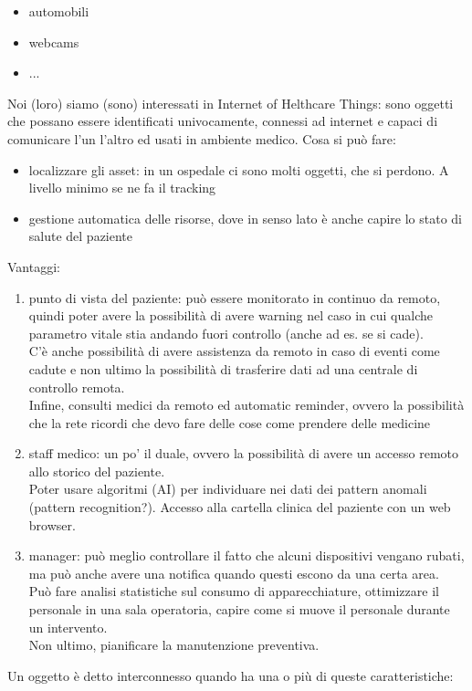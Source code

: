 \documentclass[oneside, 12pt]{extbook}
\begin{document}
\begin{itemize}
	\item automobili
	\item webcams
	\item ...
\end{itemize}
Noi (loro) siamo (sono) interessati in Internet of Helthcare Things: sono oggetti che possano essere identificati univocamente, connessi ad internet e capaci di comunicare l'un l'altro ed usati in ambiente medico. Cosa si può fare:
\begin{itemize}
	\item localizzare gli asset: in un ospedale ci sono molti oggetti, che si perdono. A livello minimo se ne fa il tracking
	\item gestione automatica delle risorse, dove in senso lato è anche capire lo stato di salute del paziente
\end{itemize}
Vantaggi:
\begin{enumerate}
	\item punto di vista del paziente: può essere monitorato in continuo da remoto, quindi poter avere la possibilità di avere warning nel caso in cui qualche parametro vitale stia andando fuori controllo (anche ad es. se si cade).\\C'è anche possibilità di avere assistenza da remoto in caso di eventi come cadute e non ultimo la possibilità di trasferire dati ad una centrale di controllo remota.\\Infine, consulti medici da remoto ed automatic reminder, ovvero la possibilità che la rete ricordi che devo fare delle cose come prendere delle medicine
	\item staff medico: un po' il duale, ovvero la possibilità di avere un accesso remoto allo storico del paziente.\\Poter usare algoritmi (AI) per individuare nei dati dei pattern anomali (pattern recognition?). Accesso alla cartella clinica del paziente con un web browser.
	\item manager: può meglio controllare il fatto che alcuni dispositivi vengano rubati, ma può anche avere una notifica quando questi escono da una certa area.\\Può fare analisi statistiche sul consumo di apparecchiature, ottimizzare il personale in una sala operatoria, capire come si muove il personale durante un intervento.\\Non ultimo, pianificare la manutenzione preventiva.
\end{enumerate}
Un oggetto è detto interconnesso quando ha una o più di queste caratteristiche:
\end{document}
